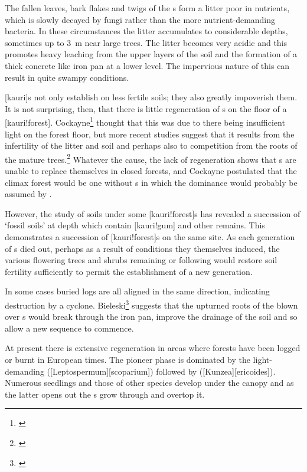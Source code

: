 The fallen leaves, bark flakes and twigs of the s form a litter poor in nutrients, which is slowly decayed by fungi rather than the more nutrient-demanding bacteria.
In these circumstances the litter accumulates to considerable depths, sometimes up to \SI{3}{\metre} near large trees.
The litter becomes very acidic and this promotes heavy leaching from the upper layers of the soil and the formation of a thick concrete like iron pan at a lower level.
The impervious nature of this can result in quite swampy conditions.

[kauri]s not only establish on less fertile soils; they also greatly impoverish them.
It is not surprising, then, that there is little regeneration of s on the floor of a [kauri!forest].
Cockayne\footnote{\cite{cockayne1928vegetation}} thought that this was due to there being insufficient light on the forest floor, but more recent studies suggest that it results from the infertility of the litter and soil and perhaps also to competition from the roots of the mature trees.\footnote{\cite{bieleski1959factors}}
Whatever the cause, the lack of regeneration shows that s are unable to replace themselves in closed forests, and Cockayne postulated that the climax forest would be one without s in which the dominance would probably be assumed by .

However, the study of soils under some [kauri!forest]s has revealed a succession of `fossil soils' at depth which contain [kauri!gum] and other remains.
This demonstrates a succession of [kauri!forest]s on the same site.
As each generation of s died out, perhaps as a result of conditions they themselves induced, the various flowering trees and shrubs remaining or following would restore soil fertility sufficiently to permit the establishment of a new  generation.

In some cases buried  logs are all aligned in the same direction, indicating destruction by a cyclone.
Bieleski\footnote{\cite{bieleski1959factors}} suggests that the upturned roots of the blown over s would break through the iron pan, improve the drainage of the soil and so allow a new sequence to commence.

At present there is extensive  regeneration in areas where forests have been logged or burnt in European times.
The pioneer phase is dominated by the light-demanding  ([Leptospermum][scoparium]) followed by  ([Kunzea][ericoides]).
Numerous  seedlings and those of other species develop under the  canopy and as the latter opens out the s grow through and overtop it.

